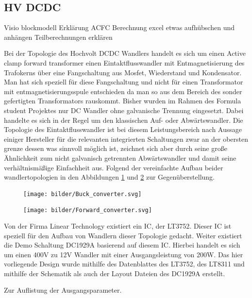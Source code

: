 \FloatBarrier
\subsection{HV DCDC}
Visio blockmodell
Erklärung ACFC
Berechnung excel etwas aufhübschen und anhängen
Teilberechnungen erklären

Bei der Topologie des Hochvolt DCDC Wandlers handelt es sich um einen Active clamp forward transformer einen Eintaktflusswandler mit Entmagnetisierung des Trafokerns über eine Fangschaltung aus Mosfet, Wiederstand und Kondensator. Man hat sich speziell für diese Fangschaltung und nicht für einen Transformator mit entmagnetisierungsspule entschieden da man so aus dem Bereich des sonder gefertigten Transformators rauskommt. Bisher wurden im Rahmen des Formula student Projektes nur DC Wandler ohne galvanische Trennung eingesetzt. Dabei handelte es sich in der Regel um den klassischen Auf- oder Abwärtswandler. Die Topologie des Eintaktflusswandler ist bei diesem Leistungsbereich nach Aussage einiger Hersteller für die relevanten integrierten Schaltungen zwar an der obersten grenze dessen was sinnvoll möglich ist, zeichnet sich aber durch seine große Ähnlichkeit zum nicht galvanisch getrennten Abwärtswandler und damit seine verhältnismäßige Einfachheit aus. Folgend der vereinfachte Aufbau beider wandlertopologien in den Abbildungen \ref{fig:buckconverter} und \ref{fig:forwardconverter} zur Gegenüberstellung.

\begin{figure}
	\centering
	\texttt{[image: bilder/Buck\_converter.svg]}
	\caption{}
	\label{fig:buckconverter}
\end{figure}

\begin{figure}
	\centering
	\texttt{[image: bilder/Forward\_converter.svg]}
	\caption{}
	\label{fig:forwardconverter}
\end{figure}

Von der Firma Linear Technology existiert ein IC, der LT3752. Dieser IC ist speziell für den Aufbau von Wandlern dieser Topologie gedacht. Weiter existiert die Demo Schaltung DC1929A basierend auf diesem IC. Hierbei handelt es sich um einen 400V zu 12V Wandler mit einer Ausgangsleistung von 200W. Das hier vorliegende Design wurde mithilfe des Datenblattes des LT3752, des LT8311 und mithilfe der Schematik als auch der Layout Dateien des DC1929A erstellt.

Zur Auflistung der Ausgangsparameter.


